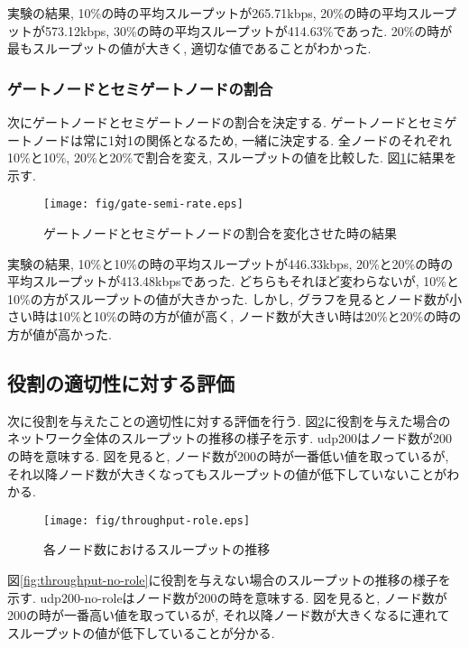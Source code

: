 実験の結果, 10\%の時の平均スループットが265.71kbps, 20\%の時の平均スループットが573.12kbps, 30\%の時の平均スループットが414.63\%であった. 20\%の時が最もスループットの値が大きく, 適切な値であることがわかった.

\subsubsection{ゲートノードとセミゲートノードの割合}
次にゲートノードとセミゲートノードの割合を決定する. ゲートノードとセミゲートノードは常に1対1の関係となるため, 一緒に決定する. 全ノードのそれぞれ10\%と10\%, 20\%と20\%で割合を変え, スループットの値を比較した. 図\ref{fig:gate-semi-rate}に結果を示す.

\begin{figure}[h]
  \centering
  \texttt{[image: fig/gate-semi-rate.eps]}
  \caption{ゲートノードとセミゲートノードの割合を変化させた時の結果}
  \label{fig:gate-semi-rate}
\end{figure}

実験の結果, 10\%と10\%の時の平均スループットが446.33kbps, 20\%と20\%の時の平均スループットが413.48kbpsであった. どちらもそれほど変わらないが, 10\%と10\%の方がスループットの値が大きかった. しかし, グラフを見るとノード数が小さい時は10\%と10\%の時の方が値が高く, ノード数が大きい時は20\%と20\%の時の方が値が高かった.

\subsection{役割の適切性に対する評価}\label{subsec:eval-role}
次に役割を与えたことの適切性に対する評価を行う. 図\ref{fig:throughput-role}に役割を与えた場合のネットワーク全体のスループットの推移の様子を示す. udp200はノード数が200の時を意味する. 図を見ると, ノード数が200の時が一番低い値を取っているが, それ以降ノード数が大きくなってもスループットの値が低下していないことがわかる.

\begin{figure}[h]
  \centering
  \texttt{[image: fig/throughput-role.eps]}
  \caption{各ノード数におけるスループットの推移}
  \label{fig:throughput-role}
\end{figure}

\newpage

図\ref{fig:throughput-no-role}に役割を与えない場合のスループットの推移の様子を示す. udp200-no-roleはノード数が200の時を意味する. 図を見ると, ノード数が200の時が一番高い値を取っているが, それ以降ノード数が大きくなるに連れてスループットの値が低下していることが分かる.

